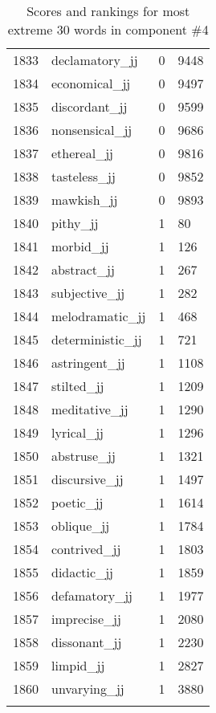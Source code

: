 \begin{longtable}[!htbp]{| rlr@{.}l |}
    1833 & declamatory\_jj & 0 & 9448 \\
    1834 & economical\_jj & 0 & 9497 \\
    1835 & discordant\_jj & 0 & 9599 \\
    1836 & nonsensical\_jj & 0 & 9686 \\
    1837 & ethereal\_jj & 0 & 9816 \\
    1838 & tasteless\_jj & 0 & 9852 \\
    1839 & mawkish\_jj & 0 & 9893 \\
    1840 & pithy\_jj & 1 & 80 \\
    1841 & morbid\_jj & 1 & 126 \\
    1842 & abstract\_jj & 1 & 267 \\
    1843 & subjective\_jj & 1 & 282 \\
    1844 & melodramatic\_jj & 1 & 468 \\
    1845 & deterministic\_jj & 1 & 721 \\
    1846 & astringent\_jj & 1 & 1108 \\
    1847 & stilted\_jj & 1 & 1209 \\
    1848 & meditative\_jj & 1 & 1290 \\
    1849 & lyrical\_jj & 1 & 1296 \\
    1850 & abstruse\_jj & 1 & 1321 \\
    1851 & discursive\_jj & 1 & 1497 \\
    1852 & poetic\_jj & 1 & 1614 \\
    1853 & oblique\_jj & 1 & 1784 \\
    1854 & contrived\_jj & 1 & 1803 \\
    1855 & didactic\_jj & 1 & 1859 \\
    1856 & defamatory\_jj & 1 & 1977 \\
    1857 & imprecise\_jj & 1 & 2080 \\
    1858 & dissonant\_jj & 1 & 2230 \\
    1859 & limpid\_jj & 1 & 2827 \\
    1860 & unvarying\_jj & 1 & 3880 \\
    \hline
    \caption{Scores and rankings for most extreme 30 words in component \#4} \\
\end{longtable}
